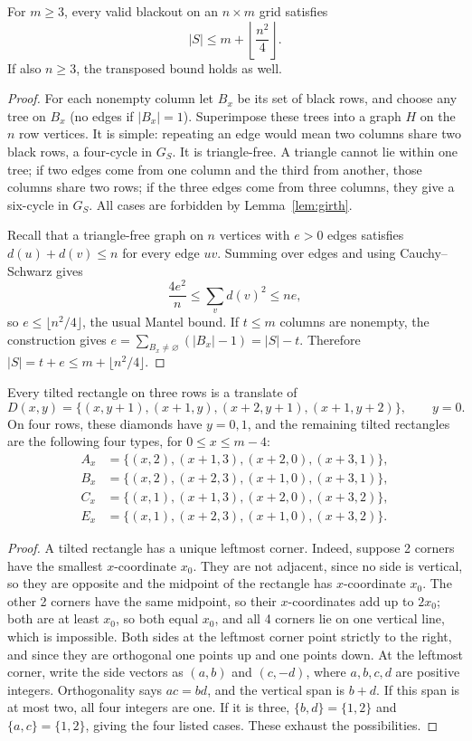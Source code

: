 \begin{theorem}\label{thm:rowbound}
For $m\ge3$, every valid blackout on an $n\times m$ grid satisfies
\[
|S|\le m+\left\lfloor\frac{n^2}{4}\right\rfloor.
\]
If also $n\ge3$, the transposed bound holds as well.
\end{theorem}
\begin{proof}
For each nonempty column let $B_x$ be its set of black rows, and choose any
tree on $B_x$ (no edges if $|B_x|=1$). Superimpose these trees into a graph $H$
on the $n$ row vertices. It is simple: repeating an edge would mean two columns
share two black rows, a four-cycle in $G_S$. It is triangle-free. A triangle
cannot lie within one tree; if two edges come from one column and the third
from another, those columns share two rows; if the three edges come from three
columns, they give a six-cycle in $G_S$. All cases are forbidden by
Lemma~\ref{lem:girth}.

Recall that a triangle-free graph on $n$ vertices with $e>0$ edges
satisfies $d(u)+d(v)\le n$ for every edge $uv$. Summing over edges and using
Cauchy--Schwarz gives
\[
\frac{4e^2}{n}\le\sum_v d(v)^2\le ne,
\]
so $e\le\lfloor n^2/4\rfloor$, the usual Mantel bound. If $t\le m$ columns
are nonempty, the construction gives
$e=\sum_{B_x\ne\varnothing}(|B_x|-1)=|S|-t$.
Therefore $|S|=t+e\le m+\lfloor n^2/4\rfloor$.
\end{proof}

\begin{lemma}\label{lem:tilted}
Every tilted rectangle on three rows is a translate of
\[
D(x,y)=\{(x,y+1),(x+1,y),(x+2,y+1),(x+1,y+2)\},
\qquad y=0.
\]
On four rows, these diamonds have $y=0,1$, and the remaining tilted rectangles
are the following four types, for $0\le x\le m-4$:
\begin{align*}
A_x&=\{(x,2),(x+1,3),(x+2,0),(x+3,1)\},\\
B_x&=\{(x,2),(x+2,3),(x+1,0),(x+3,1)\},\\
C_x&=\{(x,1),(x+1,3),(x+2,0),(x+3,2)\},\\
E_x&=\{(x,1),(x+2,3),(x+1,0),(x+3,2)\}.
\end{align*}
\end{lemma}
\begin{proof}
A tilted rectangle has a unique leftmost corner. Indeed, suppose 2 corners
have the smallest $x$-coordinate $x_0$. They are not adjacent, since no side is
vertical, so they are opposite and the midpoint of the rectangle has
$x$-coordinate $x_0$. The other 2 corners have the same midpoint, so their
$x$-coordinates add up to $2x_0$; both are at least $x_0$, so both equal $x_0$,
and all 4 corners lie on one vertical line, which is impossible.
Both sides at the leftmost corner point strictly to the right, and
since they are orthogonal one points up and one points down.
At the leftmost corner, write the side vectors as $(a,b)$ and $(c,-d)$,
where $a,b,c,d$ are positive integers. Orthogonality says $ac=bd$, and the
vertical span is $b+d$. If this span is at most two, all four integers are one.
If it is three, $\{b,d\}=\{1,2\}$ and $\{a,c\}=\{1,2\}$, giving the four
listed cases. These exhaust the possibilities.
\end{proof}

